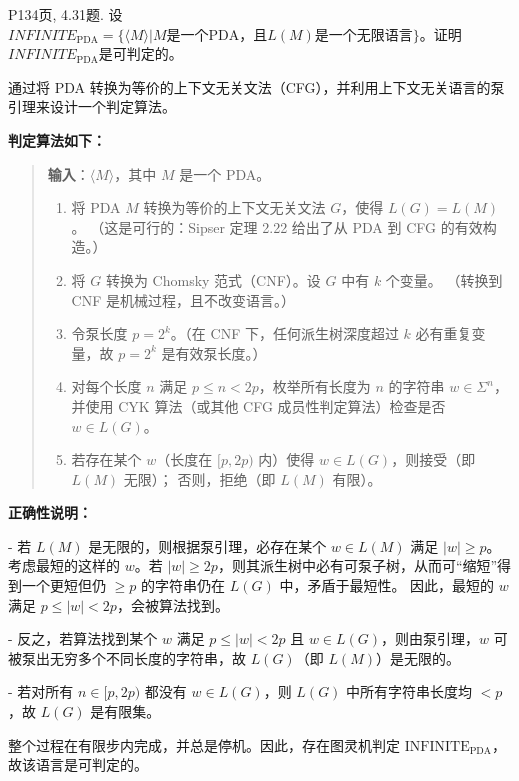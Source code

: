 \documentclass[11pt,addpoints,answers]{exam}
\begin{document}
\begin{questions}
	\question P134页, 4.31题.
	设$INFINITE_\text{PDA}=\{\langle M\rangle|M\text{是一个PDA，且}L(M)\text{是一个无限语言}\}$。证明$INFINITE_\text{PDA}$是可判定的。
	\begin{solution}
		通过将 PDA 转换为等价的上下文无关文法（CFG），并利用上下文无关语言的泵引理来设计一个判定算法。
        
        \noindent\textbf{判定算法如下：}
        
        \begin{quote}
        \textbf{输入}：$\langle M \rangle$，其中 $M$ 是一个 PDA。
        
        \begin{enumerate}
            \item 将 PDA $M$ 转换为等价的上下文无关文法 $G$，使得 $L(G) = L(M)$。  
                  （这是可行的：Sipser 定理 2.22 给出了从 PDA 到 CFG 的有效构造。）
        
            \item 将 $G$ 转换为 Chomsky 范式（CNF）。设 $G$ 中有 $k$ 个变量。  
                  （转换到 CNF 是机械过程，且不改变语言。）
        
            \item 令泵长度 $p = 2^k$。（在 CNF 下，任何派生树深度超过 $k$ 必有重复变量，故 $p = 2^k$ 是有效泵长度。）
        
            \item 对每个长度 $n$ 满足 $p \leq n < 2p$，枚举所有长度为 $n$ 的字符串 $w \in \Sigma^n$，并使用 CYK 算法（或其他 CFG 成员性判定算法）检查是否 $w \in L(G)$。
        
            \item 若存在某个 $w$（长度在 $[p, 2p)$ 内）使得 $w \in L(G)$，则接受（即 $L(M)$ 无限）；  
                  否则，拒绝（即 $L(M)$ 有限）。
        \end{enumerate}
        \end{quote}
        
        \noindent\textbf{正确性说明：}
        
        - 若 $L(M)$ 是无限的，则根据泵引理，必存在某个 $w \in L(M)$ 满足 $|w| \geq p$。  
          考虑最短的这样的 $w$。若 $|w| \geq 2p$，则其派生树中必有可泵子树，从而可“缩短”得到一个更短但仍 $\geq p$ 的字符串仍在 $L(G)$ 中，矛盾于最短性。  
          因此，最短的 $w$ 满足 $p \leq |w| < 2p$，会被算法找到。
        
        - 反之，若算法找到某个 $w$ 满足 $p \leq |w| < 2p$ 且 $w \in L(G)$，则由泵引理，$w$ 可被泵出无穷多个不同长度的字符串，故 $L(G)$（即 $L(M)$）是无限的。
        
        - 若对所有 $n \in [p, 2p)$ 都没有 $w \in L(G)$，则 $L(G)$ 中所有字符串长度均 $< p$，故 $L(G)$ 是有限集。

        整个过程在有限步内完成，并总是停机。因此，存在图灵机判定 $\mathrm{INFINITE}_{\text{PDA}}$，故该语言是可判定的。
		
	\end{solution}  
	
\end{questions}
\end{document}
